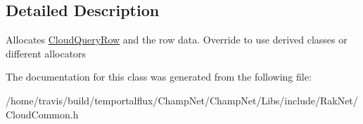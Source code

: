 \subsection{Detailed Description}
Allocates \hyperlink{struct_rak_net_1_1_cloud_query_row}{Cloud\-Query\-Row} and the row data. Override to use derived classes or different allocators 

The documentation for this class was generated from the following file\-:\begin{DoxyCompactItemize}
\item 
/home/travis/build/temportalflux/\-Champ\-Net/\-Champ\-Net/\-Libs/include/\-Rak\-Net/Cloud\-Common.\-h\end{DoxyCompactItemize}
